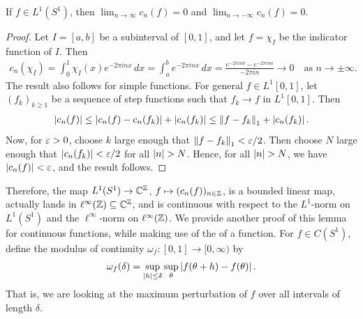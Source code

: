 \begin{lemma}
    If $f \in L^{1}(S^{1})$, then $\lim_{n \to \infty} c_{n}(f) = 0$ and $\lim_{n \to -\infty} c_{n}(f) = 0$.
\end{lemma}
\begin{proof}
    Let $I = [a,b]$ be a subinterval of $[0,1]$, and let $f = \chi_{I}$ be the indicator function of $I$. Then
    \begin{align}
        c_{n}(\chi_{I}) = \int_{0}^{1} \chi_{I}(x)e^{-2\pi i n x} \, dx = \int_{a}^{b} e^{-2\pi i n x} \, dx = \frac{e^{-2\pi i n b}-e^{-2\pi i n a}}{-2\pi i n} \to 0 \quad \text{as } n \to \pm\infty.
    \end{align}
    The result also follows for simple functions. For general $f \in L^{1}[0,1]$, let $(f_{k})_{k \geq 1}$ be a sequence of step functions such that $f_{k} \to f$ in $L^{1}[0,1]$. Then
    \begin{align}
        \left| c_{n}(f) \right| \leq \left| c_{n}(f)-c_{n}(f_{k}) \right| + \left| c_{n}(f_{k}) \right| \leq \left\lVert f-f_{k}\right\rVert_{1} + \left| c_{n}(f_{k}) \right|.
    \end{align}
    Now, for $\varepsilon > 0$, choose $k$ large enough that $\left\lVert f-f_{k}\right\rVert_{1} < \varepsilon/2$. Then choose $N$ large enough that $\left| c_{n}(f_{k}) \right| < \varepsilon/2$ for all $\left| n \right| > N$. Hence, for all $\left| n \right| > N$, we have $\left| c_{n}(f) \right| < \varepsilon$, and the result follows.
\end{proof}
Therefore, the map $L^{1}(S^{1}) \to \mathbb{C}^{\mathbb{Z}}$, $f \mapsto (c_{n}(f))_{n \in \mathbb{Z}}$, is a bounded linear map, actually lands in $\ell^{\infty}(\mathbb{Z}) \subseteq \mathbb{C}^{\mathbb{Z}}$, and is continuous with respect to the $L^{1}$-norm on $L^{1}(S^{1})$ and the $\ell^{\infty}$-norm on $\ell^{\infty}(\mathbb{Z})$. We provide another proof of this lemma for continuous functions, while making use of the  of a function. For $f \in C(S^{1})$, define the modulus of continuity $\omega_{f} : [0,1] \to [0,\infty)$ by
\begin{align}
    \omega_{f}(\delta) = \sup_{\left| h \right|\leq \delta} \sup_{\theta} \left| f(\theta+h)-f(\theta) \right|.
\end{align}
That is, we are looking at the maximum perturbation of $f$ over all intervals of length $\delta$.

